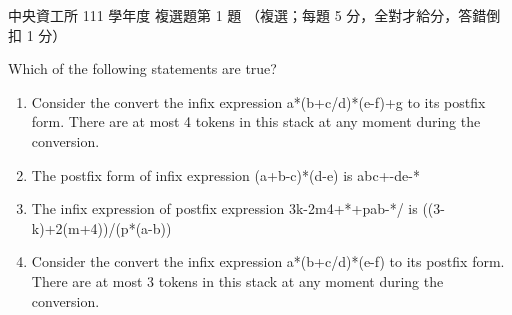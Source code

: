 \begin{pastexam}[label={px:ncu-111-dsa-01}]{中央資工所 111 學年度 複選題第 1 題}
（複選；每題 5 分，全對才給分，答錯倒扣 1 分）

Which of the following statements are true?
\begin{enumerate}[label=(\Alph*)]
\item Consider the convert the infix expression a*(b+c/d)*(e-f)+g to its postfix form. There are
at most 4 tokens in this stack at any moment during the conversion.
\item The postfix form of infix expression (a+b-c)*(d-e) is abc+-de-*
\item The infix expression of postfix expression 3k-2m4+*+pab-*/ is ((3-k)+2(m+4))/(p*(a-b))
\item Consider the convert the infix expression a*(b+c/d)*(e-f) to its postfix form. There are at
most 3 tokens in this stack at any moment during the conversion.
\end{enumerate}
\end{pastexam}

